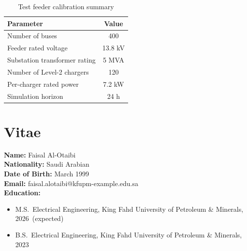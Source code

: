 \documentclass[12pt,twoside]{report}
\newcommand{\tauthor}{Faisal Al-Otaibi}
\newcommand{\tyear}{2026}
\begin{document}
\begin{table}[htbp]
\centering
\caption{Test feeder calibration summary}
\label{tab:appendix}
\begin{tabular}{@{}lc@{}}
\toprule
\textbf{Parameter} & \textbf{Value} \\
\midrule
Number of buses & 400 \\
Feeder rated voltage & 13.8 kV \\
Substation transformer rating & 5 MVA \\
Number of Level-2 chargers & 120 \\
Per-charger rated power & 7.2 kW \\
Simulation horizon & 24 h \\
\bottomrule
\end{tabular}
\end{table}

\chapter*{Vitae}
\noindent
\textbf{Name:} \tauthor\\
\textbf{Nationality:} Saudi Arabian\\
\textbf{Date of Birth:} March 1999\\
\textbf{Email:} faisal.alotaibi@kfupm-example.edu.sa\\[6pt]
\textbf{Education:}
\begin{itemize}[leftmargin=1.4cm]
  \item M.S.\ Electrical Engineering, King Fahd University of Petroleum \& Minerals, \tyear\ (expected)
  \item B.S.\ Electrical Engineering, King Fahd University of Petroleum \& Minerals, 2023
\end{itemize}
\end{document}
